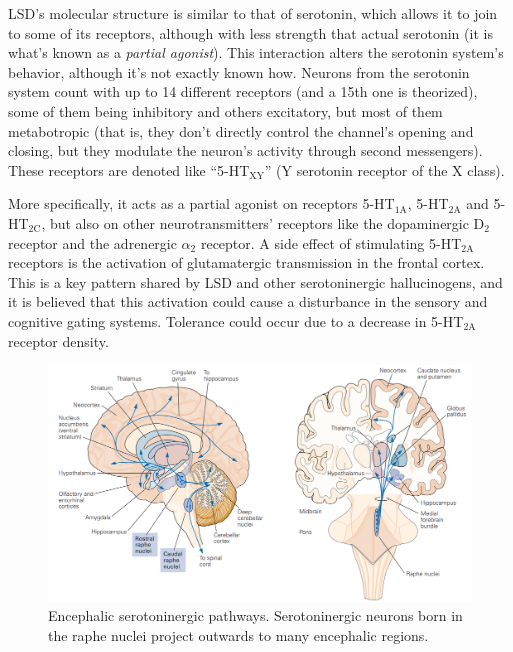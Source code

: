 LSD's molecular structure is similar to that of serotonin, which allows it to join to some of its receptors, although with less strength that actual serotonin (it is what's known as a \textit{partial agonist}). This interaction alters the serotonin system's behavior, although it's not exactly known how. Neurons from the serotonin system count with up to 14 different receptors (and a 15th one is theorized), some of them being inhibitory and others excitatory, but most of them metabotropic (that is, they don't directly control the channel's opening and closing, but they modulate the neuron's activity through second messengers). These receptors are denoted like \enquote{5-HT$_{\textrm{XY}}$} (Y serotonin receptor of the X class).

More specifically, it acts as a partial agonist on receptors 5-HT$_{\textrm{1A}}$, 5-HT$_{\textrm{2A}}$ and 5-HT$_{\textrm{2C}}$, but also on other neurotransmitters' receptors like the dopaminergic D$_2$ receptor and the adrenergic $\alpha_2$ receptor. A side effect of stimulating 5-HT$_{\textrm{2A}}$ receptors is the activation of glutamatergic transmission in the frontal cortex. This is a key pattern shared by LSD and other serotoninergic hallucinogens, and it is believed that this activation could cause a disturbance in the sensory and cognitive gating systems. Tolerance could occur due to a decrease in 5-HT$_{\textrm{2A}}$ receptor density.

\begin{figure}[H]
	\centering
	\includegraphics[width=\linewidth]{media/9-pathways.png}
	\caption{Encephalic serotoninergic pathways. Serotoninergic neurons born in the raphe nuclei project outwards to many encephalic regions.}
	\label{pathways}
\end{figure}

\newpage
